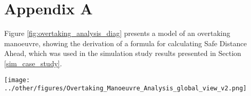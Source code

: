 \newpage
\begingroup
\let\clearpage\relax 
\onecolumn 
\section*{Appendix A}\label{appendix_a}
Figure \ref{fig:overtaking_analysis_diag} presents a model of an overtaking manoeuvre, showing the derivation of a formula for calculating Safe Distance Ahead, which was used in the simulation study results presented in Section \ref{sim_case_study}.
\begin{figure*}[h]
    \texttt{[image: ../other/figures/Overtaking\_Manoeuvre\_Analysis\_global\_view\_v2.png]}
    \caption{Schematic of Model-based Analysis of Overtaking Manoeuvre.}
    \label{fig:overtaking_analysis_diag}
\end{figure*}
\endgroup